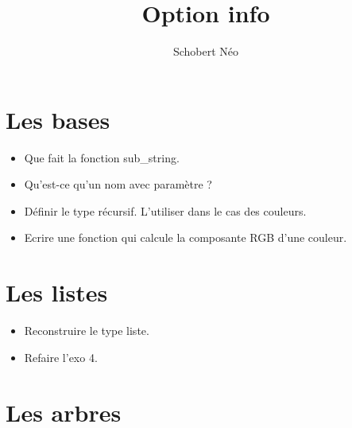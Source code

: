 \documentclass[a4paper, 11pt, hidelinks]{article}
\begin{document}
\newcommand{\grad}[1]{\vv{grad}#1}


\title{Option info}
\author{Schobert Néo}

\maketitle

\tableofcontents

\newpage 


\section{Les bases}



\begin{itemize}
    \item Que fait la fonction sub\_string.
    \item Qu'est-ce qu'un nom avec paramètre ? 
    \item Définir le type récursif. L'utiliser dans le cas des couleurs.
    \item Ecrire une fonction qui calcule la composante RGB d'une couleur.
\end{itemize}



\section{Les listes}


\begin{itemize}
    \item Reconstruire le type liste.
    \item Refaire l'exo 4.
\end{itemize}



\section{Les arbres}
\end{document}

